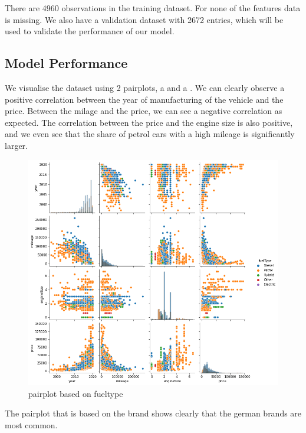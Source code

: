 \noindent There are 4960 observations in the training dataset. For none of the features data is missing. We also have a validation dataset with 2672 entries, which will be used to validate the performance of our model.

\subsection{Model Performance}

We visualise the dataset using 2 pairplots, a  and a . We can clearly observe a positive correlation between the year of manufacturing of the vehicle and the price. Between the milage and the price, we can see a negative correlation as expected. The correlation between the price and the engine size is also positive, and we even see that the share of petrol cars with a high mileage is significantly larger.

\begin{figure}[h!]
    \begin{center}
        \includegraphics[width=.7\linewidth]{images/pairplot_fueltype.png}
        \caption{pairplot based on fueltype}
        \label{fig:PairplotFueltype}
    \end{center}
\end{figure}

The pairplot that is based on the brand shows clearly that the german brands are most common.

